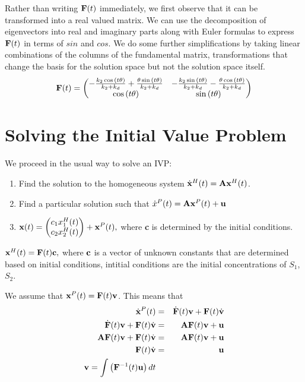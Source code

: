 \documentclass{bmcart}
\begin{document}
Rather than writing ${\bf F} (t)$ immediately, we first
observe that it can be transformed into
a real valued matrix.
We can use the decomposition of eigenvectors into
real and imaginary parts along with Euler formulas
to express ${\bf F}(t)$
in terms of $sin$ and $cos$.
We do some further simplifications by taking linear
combinations of the columns of the fundamental matrix,
transformations that change the basis for the solution space
but not the solution space itself.
\begin{equation*}
{\bf F} (t) = \begin{pmatrix}- \frac{k_{2} \cos{\left(t \theta \right)}}{k_{2} + k_{d}} 
+ \frac{\theta \sin{\left(t \theta \right)}}{k_{2} + k_{d}} & - \frac{k_{2} \sin{\left(t \theta \right)}}{k_{2} + k_{d}} - \frac{\theta \cos{\left(t \theta \right)}}{k_{2} + k_{d}}\\\cos{\left(t \theta \right)} & \sin{\left(t \theta \right)}
\end{pmatrix}
\end{equation*}

\section{Solving the Initial Value Problem}
We proceed in the usual way to solve an IVP:
\begin{enumerate}
\item Find the
solution to the homogeneous system
$\dot{\bf x}^H (t) = {\bf A} {\bf x}^H (t)$.
\item
Find a particular solution such that
$\dot{x}^P (t) = {\bf A} {\bf x}^P (t) + {\bf u}$
\item
${\bf x} (t) = 
\begin{pmatrix}
c_1 x_1^H (t) \\
c_2 x_2^H (t) \\
\end{pmatrix}
 + {\bf x}^P (t),$
 where
{\bf c} is determined by the initial conditions.
\end{enumerate}

${\bf x}^H (t) = {\bf F} (t) {\bf c},$ where ${\bf c}$ is a vector
of unknown constants that are determined based on initial conditions,
intitial conditions are the initial concentrations of
$S_1$, $S_2$.

We assume that ${\bf x}^P (t) = {\bf F}(t) {\bf v}$. This means that
\begin{eqnarray*}
\dot{\bf x}^P (t) &= & \dot{\bf F} (t) {\bf v} + {\bf F} (t) \dot{\bf v} \\
\dot{\bf F} (t) {\bf v} + {\bf F} (t) \dot{\bf v} & = & {\bf A} {\bf F}(t) {\bf v} + {\bf u} \\
{\bf A} {\bf F} (t){\bf v} + {\bf F} (t) \dot{\bf v} & = & {\bf A} {\bf F} (t) {\bf v} + {\bf u} \\
{\bf F} (t) \dot{\bf v} & = & {\bf u} \\
{\bf v} = \int \left( {\bf F}^{-1} (t) {\bf u} \right)dt
\end{eqnarray*}
\end{document}
